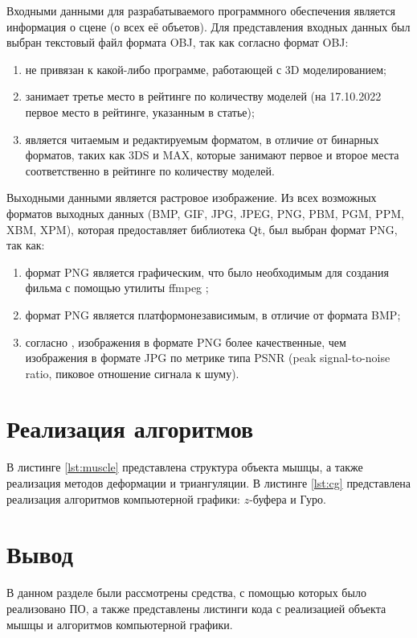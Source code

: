 Входными данными для разрабатываемого программного обеспечения является информация о сцене (о всех её объетов). Для представления входных данных был выбран текстовый файл формата OBJ, так как согласно \cite{3d} формат OBJ:
\begin{enumerate}[label=\arabic*)]
	\item не привязан к какой-либо программе, работающей с 3D моделированием;
	\item занимает третье место в рейтинге по количеству моделей (на 17.10.2022 первое место в рейтинге, указанным в статье);
	\item является читаемым и редактируемым форматом, в отличие от бинарных форматов, таких как 3DS и MAX, которые занимают первое и второе места соответственно в рейтинге по количеству моделей.
\end{enumerate}

Выходными данными является растровое изображение. Из всех возможных форматов выходных данных (BMP, GIF, JPG, JPEG, PNG, PBM, PGM, PPM, XBM, XPM), которая предоставляет библиотека Qt, был выбран формат PNG, так как:
\begin{enumerate}[label=\arabic*)]
	\item формат PNG является графическим, что было необходимым для создания фильма с помощью утилиты ffmpeg \cite{ffmpeg};
	\item формат PNG является платформонезависимым, в отличие от формата BMP;
	\item согласно \cite{jpgvspng}, изображения в формате PNG более качественные, чем изображения в формате JPG по метрике типа PSNR (peak signal-to-noise ratio, пиковое отношение сигнала к шуму).
\end{enumerate}

\section{Реализация алгоритмов}

В листинге \ref{lst:muscle} представлена структура объекта мышцы, а также реализация методов деформации и триангуляции. В листинге \ref{lst:cg} представлена реализация алгоритмов компьютерной графики: $z$-буфера и Гуро.


\section*{Вывод}

В данном разделе были рассмотрены средства, с помощью которых было реализовано ПО, а также представлены листинги кода с реализацией объекта мышцы и алгоритмов компьютерной графики.
